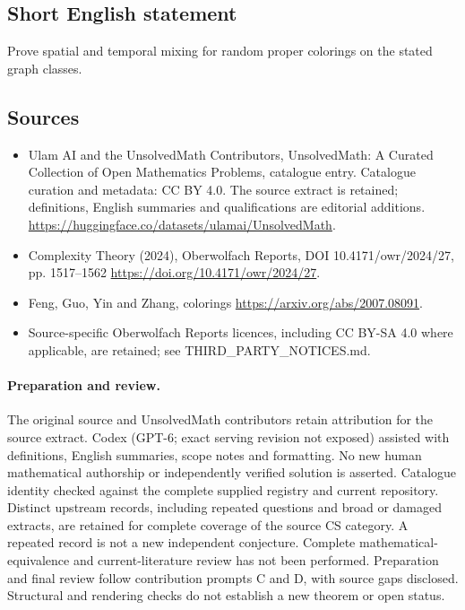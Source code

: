 \documentclass[11pt]{article}
\begin{document}
\subsection{Short English statement}
Prove spatial and temporal mixing for random proper colorings on the stated graph classes.
\subsection{Sources}
\begin{itemize}
\item[\hypertarget{source:statement:1}{S1}] Ulam AI and the UnsolvedMath Contributors, UnsolvedMath: A Curated Collection of Open Mathematics Problems, catalogue entry. Catalogue curation and metadata: CC BY 4.0. The source extract is retained; definitions, English summaries and qualifications are editorial additions.
\url{https://huggingface.co/datasets/ulamai/UnsolvedMath}.
\item[\hypertarget{source:statement:2}{S2}] Complexity Theory (2024), Oberwolfach Reports, DOI 10.4171/owr/2024/27, pp. 1517--1562
\url{https://doi.org/10.4171/owr/2024/27}.
\item[\hypertarget{source:statement:3}{S3}] Feng, Guo, Yin and Zhang, colorings
\url{https://arxiv.org/abs/2007.08091}.
\item Source-specific Oberwolfach Reports licences, including CC BY-SA 4.0 where applicable, are retained; see THIRD\_PARTY\_NOTICES.md.
\end{itemize}
\paragraph{Preparation and review.}
The original source and UnsolvedMath contributors retain attribution for the source extract. Codex (GPT-6; exact serving revision not exposed) assisted with definitions, English summaries, scope notes and formatting. No new human mathematical authorship or independently verified solution is asserted. Catalogue identity checked against the complete supplied registry and current repository. Distinct upstream records, including repeated questions and broad or damaged extracts, are retained for complete coverage of the source CS category. A repeated record is not a new independent conjecture. Complete mathematical-equivalence and current-literature review has not been performed. Preparation and final review follow contribution prompts C and D, with source gaps disclosed. Structural and rendering checks do not establish a new theorem or open status.
\label{end:statement}
\end{document}
